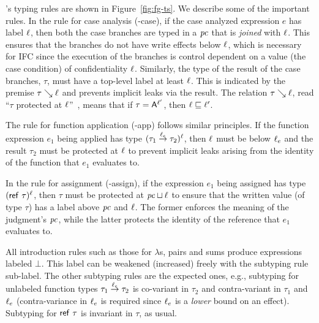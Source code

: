 {\fg}'s typing rules are shown in Figure~\ref{fig:fg-ts}. We describe
some of the important rules. In the rule for case analysis
({{\fg}-case}), if the case analyzed expression $e$ has label
$\ell$, then both the case branches are typed in a $\mathit{pc}$ that is
\emph{joined} with $\ell$. This ensures that the branches do not
have write effects below $\ell$, which is necessary for IFC since
the execution of the branches is control dependent on a value (the
case condition) of confidentiality $\ell$. Similarly, the type of
the result of the case branches, $\tau$, must have a top-level label
at least $\ell$. This is indicated by the premise $\tau \searrow
\ell$ and prevents implicit leaks via the result. The relation
$\tau \searrow \ell$, read ``$\tau$ protected at
$\ell$''~\cite{popl99-DCC}, means that if $\tau =
\mathsf{A}^{\ell'}$, then $\ell \sqsubseteq \ell'$.

The rule for function application ({{\fg}-app}) follows similar
principles. If the function expression $e_1$ being applied has type
$(\tau_1 \overset{\ell_e}\to \tau_2)^{\ell}$, then $\ell$ must be below
$\ell_e$ and the result $\tau_2$ must be protected at $\ell$ to
prevent implicit leaks arising from the identity of the function that
$e_1$ evaluates to.

In the rule for assignment ({{\fg}-assign}), if the expression
$e_1$ being assigned has type $(\mathsf{ref}~ \tau)^\ell$, then $\tau$
must be protected at $\mathit{pc} \sqcup \ell$ to ensure that the written
value (of type $\tau$) has a label above $\mathit{pc}$ and $\ell$. The
former enforces the meaning of the judgment's $\mathit{pc}$, while the latter
protects the identity of the reference that $e_1$ evaluates to.

All introduction rules such as those for $\lambda$s, pairs and sums
produce expressions labeled $\bot$. This label can be weakened
(increased) freely with the subtyping rule {{\fg}sub-label}. The
other subtyping rules are the expected ones, e.g., subtyping for
unlabeled function types $\tau_1 \overset{\ell_e}\to \tau_2$ is co-variant in
$\tau_2$ and contra-variant in $\tau_1$ and $\ell_e$
(contra-variance in $\ell_e$ is required since $\ell_e$ is a
\emph{lower} bound on an effect). Subtyping for $\mathsf{ref}~\tau$ is
invariant in $\tau$, as usual.


